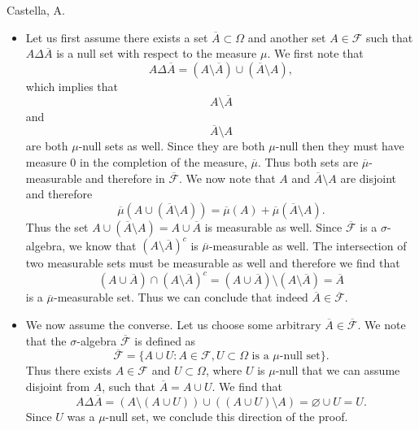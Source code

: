 \begin{solution}[4.7]{Castella, A.}
    \begin{itemize}
        \item Let us first assume there exists a set $\overline{A} \subset \Omega$ and another set $A \in \mathcal{F}$ such that $A\Delta\overline{A}$ is a null set with respect to the measure $\mu$. We first note that 
        $$
            A \Delta \overline{A} = (A\setminus\overline{A}) \cup (\overline{A}\setminus A),
        $$
        which implies that
        $$
            A \setminus \overline{A}
        $$
        and
        $$
            \overline{A} \setminus A
        $$
        are both $\mu$-null sets as well. Since they are both $\mu$-null then they must have measure 0 in the completion of the measure, $\overline{\mu}$. Thus both sets are $\overline{\mu}$-measurable and therefore in $\overline{\mathcal{F}}$. We now note that $A$ and $\overline{A}\setminus A$ are disjoint and therefore
        $$
            \overline{\mu}(A \cup (\overline{A}\setminus A)) = \overline{\mu}(A) + \overline{\mu}(\overline{A}\setminus A).
        $$
        Thus the set $A \cup (\overline{A}\setminus A) = A \cup \overline{A}$ is measurable as well. Since $\overline{\mathcal{F}}$ is a $\sigma$-algebra, we know that $(A\setminus\overline{A})^c$ is $\overline{\mu}$-measurable as well. The intersection of two measurable sets must be measurable as well and therefore we find that
        $$
            (A \cup \overline{A})\cap (A\setminus\overline{A})^c = (A\cup\overline{A})\setminus(A\setminus\overline{A}) = \overline{A}
        $$
        is a $\overline{\mu}$-measurable set. Thus we can conclude that indeed $\overline{A} \in \overline{\mathcal{F}}$.
        \item We now assume the converse. Let us choose some arbitrary $\overline{A} \in \overline{\mathcal{F}}$. We note that the $\sigma$-algebra $\overline{\mathcal{F}}$ is defined as
        $$
            \overline{\mathcal{F}} = \{A \cup U : A \in \mathcal{F}, U\subset\Omega\text{ is a }\mu\text{-null set}\}.
        $$
        Thus there exists $A \in \mathcal{F}$ and $U \subset \Omega$, where $U$ is $\mu$-null that we can assume disjoint from $A$, such that $\overline{A} = A\cup U$. We find that
        $$
            A\Delta\overline{A} = (A\setminus(A\cup U))\cup((A\cup U)\setminus A) = \varnothing\cup U = U.
        $$
        Since $U$ was a $\mu$-null set, we conclude this direction of the proof.
    \end{itemize}
\end{solution}
